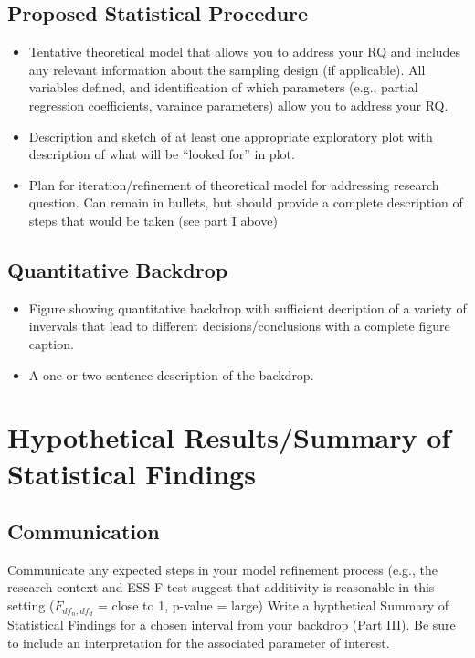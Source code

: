\documentclass[11pt]{article}
\begin{document}
\subsection{Proposed Statistical Procedure}
\label{sec:orgf78c77f}

\begin{itemize}
\item Tentative theoretical model that allows you to address your RQ and includes any relevant information about the sampling design (if applicable). All variables defined, and identification of which parameters (e.g., partial regression coefficients, varaince parameters) allow you to address your RQ.
\item Description and sketch of at least one appropriate exploratory plot with description of what will be “looked for” in plot.
\item Plan for iteration/refinement of theoretical model for addressing research question. Can remain in bullets, but should provide a complete description of steps that would be taken (see part I above)
\end{itemize}


\subsection{Quantitative Backdrop}
\label{sec:org58b9407}

\begin{itemize}
\item Figure showing quantitative backdrop with sufficient decription of a variety of invervals that lead to different decisions/conclusions with a complete figure caption.
\item A one or two-sentence description of the backdrop.
\end{itemize}

\section{Hypothetical Results/Summary of Statistical Findings}
\label{sec:org23fb616}

\subsection{Communication}
\label{sec:org51ccfaa}

Communicate any expected steps in your model refinement process (e.g., the research context and ESS F-test suggest that additivity is reasonable in this setting (\(F_{df_n, df_d}\) = close to 1, p-value = large)
Write a hypthetical Summary of Statistical Findings for a chosen interval from your backdrop (Part III). Be sure to include an interpretation for the associated parameter of interest.
\end{document}
